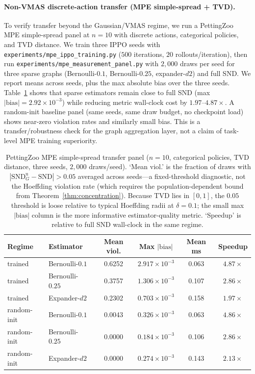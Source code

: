 \documentclass{article}
\theoremstyle{plain}
\theoremstyle{definition}
\theoremstyle{remark}
\newcommand{\SND}{\ensuremath{\mathrm{SND}}}
\newcommand{\SNDG}{\mathrm{SND}_{G}}
\begin{document}
\paragraph{Non-VMAS discrete-action transfer (MPE simple-spread + TVD).}
To verify transfer beyond the Gaussian/VMAS regime, we run a PettingZoo
MPE simple-spread panel at $n{=}10$ with discrete actions, categorical
policies, and TVD distance. We train three IPPO seeds with
\texttt{experiments/mpe\_ippo\_training.py}
($500$ iterations, $20$ rollouts/iteration), then run
\texttt{experiments/mpe\_measurement\_panel.py} with $2{,}000$ draws per
seed for three sparse graphs (Bernoulli-$0.1$, Bernoulli-$0.25$,
expander-$d2$) and full SND. We report means across seeds, plus the max
absolute bias over the three seeds. Table~\ref{tab:mpe-tvd-panel} shows
that sparse estimators remain close to full SND (max
$|\mathrm{bias}|=2.92\times10^{-3}$) while reducing metric wall-clock
cost by $1.97$--$4.87\times$. A random-init baseline panel (same seeds,
same draw budget, no checkpoint load) shows near-zero violation rates
and similarly small bias. This is a transfer/robustness check for the
graph aggregation layer, not a claim of task-level MPE training
superiority.

\begin{table}[t]
\centering
\small
\begin{tabular}{llcccc}
\toprule
\textbf{Regime} & \textbf{Estimator} & \textbf{Mean viol.} & \textbf{Max $|\mathrm{bias}|$} & \textbf{Mean ms} & \textbf{Speedup} \\
\midrule
trained & Bernoulli-$0.1$ & 0.6252 & $2.917{\times}10^{-3}$ & 0.063 & $4.87\times$ \\
trained & Bernoulli-$0.25$ & 0.3757 & $1.306{\times}10^{-3}$ & 0.107 & $2.86\times$ \\
trained & Expander-$d2$ & 0.2302 & $0.703{\times}10^{-3}$ & 0.158 & $1.97\times$ \\
\midrule
random-init & Bernoulli-$0.1$ & 0.0043 & $0.326{\times}10^{-3}$ & 0.063 & $4.86\times$ \\
random-init & Bernoulli-$0.25$ & 0.0000 & $0.184{\times}10^{-3}$ & 0.106 & $2.86\times$ \\
random-init & Expander-$d2$ & 0.0000 & $0.274{\times}10^{-3}$ & 0.143 & $2.13\times$ \\
\bottomrule
\end{tabular}
\caption{PettingZoo MPE simple-spread transfer panel ($n{=}10$,
categorical policies, TVD distance, three seeds, $2{,}000$ draws/seed).
`Mean viol.' is the fraction of draws with
$|\SNDG^{\mathrm{u}}-\SND|>0.05$ averaged across seeds---a
fixed-threshold diagnostic, not the Hoeffding violation rate (which
requires the population-dependent bound from
Theorem~\ref{thm:concentration}). Because TVD lies in $[0,1]$, the
$0.05$ threshold is loose relative to typical Hoeffding radii at
$\delta{=}0.1$; the small max $|\mathrm{bias}|$ column is the more
informative estimator-quality metric. `Speedup' is relative to full SND
wall-clock in the same regime.}
\label{tab:mpe-tvd-panel}
\end{table}
\end{document}
